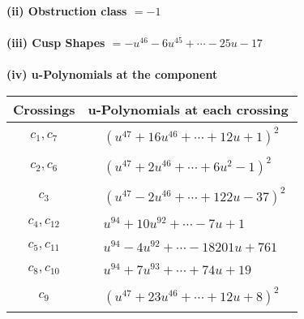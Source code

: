\documentclass[1p]{elsarticle_modified}
\theoremstyle{definition}
\begin{document}
\flushleft \textbf{(ii) Obstruction class $= -1$}\\~\\
\flushleft \textbf{(iii) Cusp Shapes $= - u^{46}-6 u^{45}+\cdots-25 u-17$}\\~\\
\newpage\renewcommand{\arraystretch}{1}
\flushleft \textbf{(iv) u-Polynomials at the component}\newline \\
\begin{tabular}{m{50pt}|m{274pt}}
Crossings & \hspace{64pt}u-Polynomials at each crossing \\
\hline $$\begin{aligned}c_{1},c_{7}\end{aligned}$$&$\begin{aligned}
&(u^{47}+16 u^{46}+\cdots+12 u+1)^{2}
\end{aligned}$\\
\hline $$\begin{aligned}c_{2},c_{6}\end{aligned}$$&$\begin{aligned}
&(u^{47}+2 u^{46}+\cdots+6 u^2-1)^{2}
\end{aligned}$\\
\hline $$\begin{aligned}c_{3}\end{aligned}$$&$\begin{aligned}
&(u^{47}-2 u^{46}+\cdots+122 u-37)^{2}
\end{aligned}$\\
\hline $$\begin{aligned}c_{4},c_{12}\end{aligned}$$&$\begin{aligned}
&u^{94}+10 u^{92}+\cdots-7 u+1
\end{aligned}$\\
\hline $$\begin{aligned}c_{5},c_{11}\end{aligned}$$&$\begin{aligned}
&u^{94}-4 u^{92}+\cdots-18201 u+761
\end{aligned}$\\
\hline $$\begin{aligned}c_{8},c_{10}\end{aligned}$$&$\begin{aligned}
&u^{94}+7 u^{93}+\cdots+74 u+19
\end{aligned}$\\
\hline $$\begin{aligned}c_{9}\end{aligned}$$&$\begin{aligned}
&(u^{47}+23 u^{46}+\cdots+12 u+8)^{2}
\end{aligned}$\\
\hline
\end{tabular}\\~\\
\end{document}
